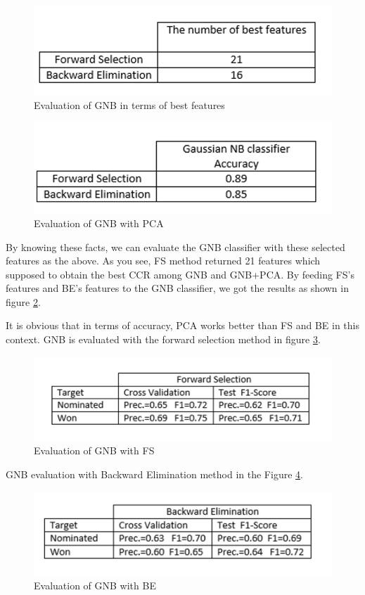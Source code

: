 \documentclass[journal,transmag]{IEEEtran}
\begin{document}
\begin{figure}
\includegraphics[scale=.35]{foj5}
 \caption{Evaluation of GNB in terms of best features}
\label{fig_foj5}
\end{figure}

\begin{figure}
\includegraphics[scale=.4]{foj6}
 \caption{Evaluation of GNB with PCA}
\label{fig_foj6}
\end{figure}
By knowing these facts, we can evaluate the GNB classifier with these selected features as the above. As you see, FS method returned 21 features which supposed to obtain the best CCR among GNB and GNB+PCA. By feeding FS's features and BE's features to the GNB classifier, we got the results as shown in figure \ref{fig_foj6}.

It is obvious that in terms of accuracy, PCA works better than FS and BE in this context. GNB is evaluated with the forward selection method in figure \ref{fig_foj7}.

\begin{figure}
\includegraphics[scale=.35]{foj7}
 \caption{Evaluation of GNB with FS}
\label{fig_foj7}
\end{figure}
GNB evaluation with Backward Elimination method in the Figure \ref{fig_foj8}.


\begin{figure}
\includegraphics[scale=.35]{foj8}
 \caption{Evaluation of GNB with BE}
\label{fig_foj8}
\end{figure}
\end{document}
